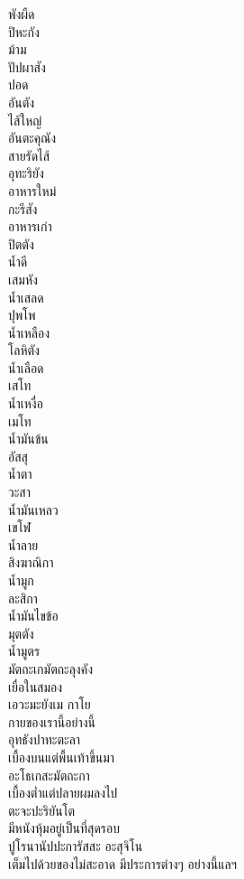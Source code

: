 \documentclass{article}
\begin{document}
\indent พังผืด\\
ปิหะกัง \\
\indent ม้าม\\
ปัปผาสัง \\
\indent ปอด\\
อันตัง \\
\indent ไส้ใหญ่\\
อันตะคุณัง \\
\indent สายรัดไส้\\
อุทะริยัง \\
\indent อาหารใหม่\\
กะรีสัง \\
\indent อาหารเก่า\\
ปิตตัง \\
\indent น้ำดี\\
เสมหัง \\
\indent น้ำเสลด\\
ปุพโพ \\
\indent น้ำเหลือง\\
โลหิตัง \\
\indent น้ำเลือด\\
เสโท \\
\indent น้ำเหงื่อ\\
เมโท \\
\indent น้ำมันข้น\\
อัสสุ \\
\indent น้ำตา\\
วะสา \\
\indent น้ำมันเหลว\\
เขโฬ \\
\indent น้ำลาย\\
สิงฆาณิกา \\
\indent น้ำมูก\\
ละสิกา \\
\indent น้ำมันไขข้อ\\
มุตตัง \\
\indent น้ำมูตร\\
มัตถะเกมัตถะลุงคัง \\
\indent เยื่อในสมอง\\
เอวะมะยังเม กาโย \\
\indent กายของเรานี้อย่างนี้\\
อุทธังปาทะตะลา \\
\indent เบื้องบนแต่พื้นเท้าขึ้นมา\\
อะโธเกสะมัตถะกา \\
\indent เบื้องต่ำแต่ปลายผมลงไป\\
ตะจะปะริยันโต \\
\indent มีหนังหุ้มอยู่เป็นที่สุดรอบ\\
ปูโรนานัปปะการัสสะ อะสุจิโน\\
\indent เต็มไปด้วยของไม่สะอาด มีประการต่างๆ อย่างนี้แลฯ\\
\end{document}
